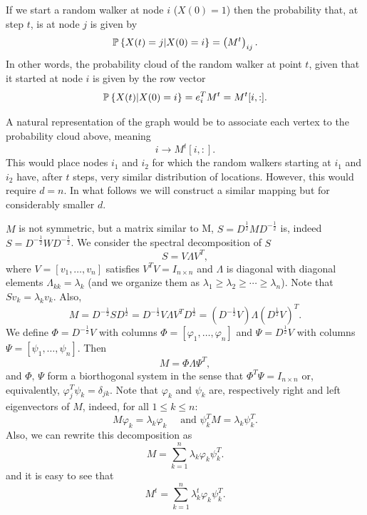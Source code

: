 If we start a random walker at node $i$ ($X(0)=1$) then the probability that, at step $t$, is at node $j$ is given by
\[
 {\mathbb{P}}\left\{ X(t) = j | X(0) = i   \right\} = \left(M^t\right)_{ij}.
\]
In other words, the probability cloud of the random walker at point $t$, given that it started at node $i$ is given by the row vector
\[
 {\mathbb{P}}\left\{ X(t) | X(0) = i   \right\} = e_i^TM^t = M^t[i,:].
\]

\begin{remark}\label{remark:2:DMwithoutPhi}
 A natural representation of the graph would be to associate each vertex to the probability cloud above, meaning
 \[
  i \to M^t[i,:].
 \]
This would place nodes $i_1$ and $i_2$ for which the random walkers starting at $i_1$ and $i_2$ have, after $t$ steps, very similar distribution of locations. However, this would require $d=n$. In what follows we will construct a similar mapping but for considerably smaller $d$.
\end{remark}

$M$ is not symmetric, but a matrix similar to M, $S = D^{\frac12} M D^{-\frac12}$ is, indeed $S = D^{-\frac12}WD^{-\frac12}$. We consider the spectral decomposition of $S$
\begin{equation}\label{eq:SisVlambdaVT}
S = V\Lambda V^T,
\end{equation}
where $V= \left[ v_1,\dots,v_n  \right]$ satisfies $V^TV = I_{n\times n}$ and $\Lambda$ is diagonal with diagonal elements $\Lambda_{kk} = \lambda_k$ (and we organize them as $\lambda_1\geq \lambda_2 \geq \cdots \geq \lambda_n$). Note that $Sv_k = \lambda_k v_k$. Also,
\[
M  = D^{-\frac12} S D^{\frac12} = D^{-\frac12} V\Lambda V^T D^{\frac12} = \left( D^{-\frac12} V\right) \Lambda \left( D^{\frac12}  V \right)^T.
\]
We define $\Phi = D^{-\frac12} V$ with columns $\Phi = \left[ \varphi_1,\dots,\varphi_n\right]$  and $\Psi = D^{\frac12} V$ with columns $\Psi = \left[ \psi_1,\dots,\psi_n\right]$. Then
\begin{equation}\label{eq:MisPhiLambdaPsiT}
M = \Phi \Lambda \Psi^T,
\end{equation}
and $\Phi,\, \Psi$ form a biorthogonal system in the sense that $\Phi^T\Psi = I_{n\times n}$ or, equivalently, $\varphi_j^T\psi_k = \delta_{jk}$. Note that $\varphi_k$ and $\psi_k$ are, respectively right and left eigenvectors of $M$, indeed, for all $1\leq k\leq n$:
\[
M\varphi_k = \lambda_k \varphi_k \quad \text{ and } \psi_k^T M = \lambda_k \psi_k^T.
\]
Also, we can rewrite this decomposition as
\[
M = \sum_{k=1}^n \lambda_k \varphi_k \psi_k^T.
\]
and it is easy to see that
\begin{equation}\label{eq:Masrank1withphiandpsi}
M^t = \sum_{k=1}^n \lambda_k^t \varphi_k \psi_k^T.
\end{equation}

